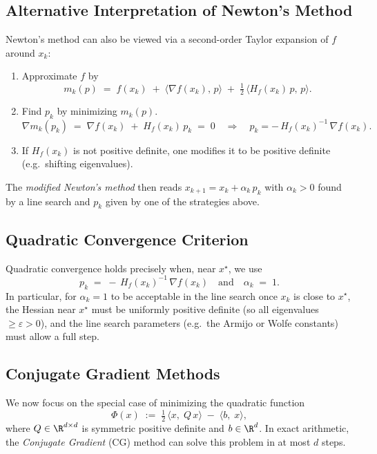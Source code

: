 \subsection*{Alternative Interpretation of Newton's Method}
Newton's method can also be viewed via a second-order Taylor expansion of \(f\) around \(x_k\):

\begin{enumerate}
	\item Approximate \(f\) by
	      \[
		      m_k(p) \;=\; f(x_k) \;+\; \langle \nabla f(x_k),\, p\rangle \;+\; \tfrac12\,\langle H_f(x_k)\,p,\,p\rangle.
	      \]
	\item Find \(p_k\) by minimizing \(m_k(p)\).
	      \[
		      \nabla m_k(p_k) \;=\; \nabla f(x_k) \;+\; H_f(x_k)\,p_k \;=\; 0
		      \quad\Longrightarrow\quad
		      p_k = -\,H_f(x_k)^{-1}\,\nabla f(x_k).
	      \]
	\item If \(H_f(x_k)\) is not positive definite, one modifies it to be positive definite (e.g.\ shifting eigenvalues).
\end{enumerate}

The \emph{modified Newton's method} then reads \(x_{k+1} = x_k + \alpha_k\,p_k\) with \(\alpha_k>0\) found by a line search and \(p_k\) given by one of the strategies above.

\subsection*{Quadratic Convergence Criterion}
Quadratic convergence holds precisely when, near \(x^\star\), we use
\[
	p_k \;=\; -\,H_f(x_k)^{-1}\,\nabla f(x_k)
	\quad\text{and}\quad
	\alpha_k \;=\; 1.
\]
In particular, for \(\alpha_k = 1\) to be acceptable in the line search once \(x_k\) is close to \(x^\star\), the Hessian near \(x^\star\) must be uniformly positive definite (so all eigenvalues \(\ge \varepsilon > 0\)), and the line search parameters (e.g.\ the Armijo or Wolfe constants) must allow a full step.

\subsection*{Conjugate Gradient Methods}

We now focus on the special case of minimizing the quadratic function
\[
	\Phi(x) \;:=\; \tfrac12\,\langle x,\;Q\,x\rangle \;-\; \langle b,\;x\rangle,
\]
where \(Q \in \R^{d\times d}\) is symmetric positive definite and \(b \in \R^d\). In exact arithmetic, the \emph{Conjugate Gradient} (CG) method can solve this problem in at most \(d\) steps.

